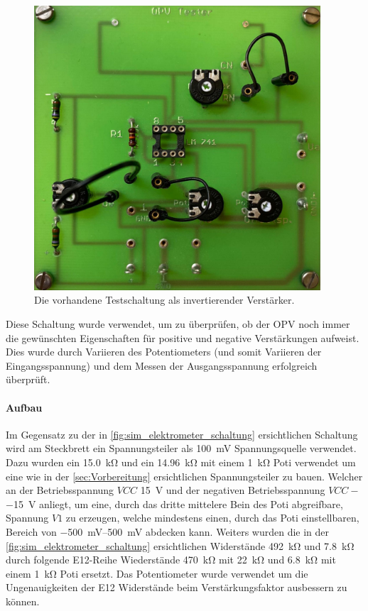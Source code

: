 \documentclass[12pt,english,ngerman]{scrartcl}
\begin{document}
\begin{figure}[H]
  \centering
    \includegraphics[width=0.95\textwidth]{./figures/testschaltung.jpeg}
  \caption{Die vorhandene Testschaltung als invertierender Verstärker.}
  \label{fig:testschaltung}
\end{figure}

Diese Schaltung wurde verwendet, um zu überprüfen, ob der OPV noch immer die
gewünschten Eigenschaften für positive und negative Verstärkungen aufweist. Dies
wurde durch Variieren des Potentiometers (und somit Variieren der
Eingangsspannung) und dem Messen der Ausgangsspannung erfolgreich überprüft.

\paragraph{Aufbau}
Im Gegensatz zu der in \autoref{fig:sim_elektrometer_schaltung} ersichtlichen
Schaltung wird am Steckbrett ein Spannungsteiler als \SI{100}{mV}
Spannungsquelle verwendet. Dazu wurden ein \SI{15.0}{\kilo\ohm} und ein
\SI{14.96}{\kilo\ohm} mit einem \SI{1}{\kilo\ohm} Poti verwendet um eine wie in
der \autoref{sec:Vorbereitung} ersichtlichen Spannungsteiler zu bauen. Welcher
an der Betriebsspannung $VCC$ \SI{+15}{\volt} und der negativen
Betriebsspannung $VCC-$ \SI{-15}{\volt} anliegt, um eine, durch das dritte
mittelere Bein des Poti abgreifbare, Spannung $V1$ zu erzeugen, welche
mindestens einen, durch das Poti einstellbaren, Bereich von
\SIrange{-500}{500}{\milli\volt} abdecken kann. Weiters wurden die in der
\autoref{fig:sim_elektrometer_schaltung} ersichtlichen Widerstände
\SI{492}{\kilo\ohm} und \SI{7.8}{\kilo\ohm} durch folgende E12-Reihe
Wiederstände \SI{470}{\kilo\ohm} mit \SI{22}{\kilo\ohm} und \SI{6.8}{\kilo\ohm}
mit einem \SI{1}{\kilo\ohm} Poti ersetzt. Das Potentiometer wurde verwendet um
die Ungenauigkeiten der E12 Widerstände beim Verstärkungsfaktor ausbessern zu
können.
\end{document}
